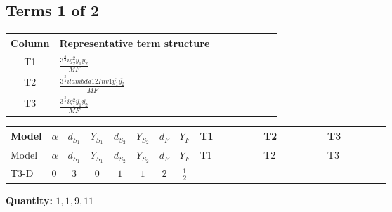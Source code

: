 \documentclass[8pt]{article}
\begin{document}
\begin{landscape}
\subsection*{Terms 1 of 2}
\begin{center}
\begin{tabular}{@{}c >{\raggedright\arraybackslash}p{0.82\linewidth}@{}}
\toprule
Column & Representative term structure \\
\midrule
T1 & \(\displaystyle \frac{3^{\frac{3}{4}} i g_{2}^{2} \overline{y_{1}} \overline{y_{2}}}{MF}\) \\
\midrule
T2 & \(\displaystyle \frac{3^{\frac{3}{4}} i lambda12Inv1 \overline{y_{1}} \overline{y_{2}}}{MF}\) \\
\midrule
T3 & \(\displaystyle \frac{3^{\frac{3}{4}} i g_{1}^{2} \overline{y_{1}} \overline{y_{2}}}{MF}\) \\
\midrule
\bottomrule
\end{tabular}
\end{center}
\smallskip
\tiny
\begin{longtable}{@{}llcccccc >{\raggedright\arraybackslash}p{0.21\linewidth} >{\raggedright\arraybackslash}p{0.21\linewidth} >{\raggedright\arraybackslash}p{0.21\linewidth}@{}}
\toprule
Model & $\alpha$ & $d_{S_1}$ & $Y_{S_1}$ & $d_{S_2}$ & $Y_{S_2}$ & $d_F$ & $Y_F$ & T1 & T2 & T3 \\
\midrule
\endfirsthead
\toprule
Model & $\alpha$ & $d_{S_1}$ & $Y_{S_1}$ & $d_{S_2}$ & $Y_{S_2}$ & $d_F$ & $Y_F$ & T1 & T2 & T3 \\
\midrule
\endhead
T3-D & $0$ & $3$ & $0$ & $1$ & $1$ & $2$ & $\frac{1}{2}$ & \scriptsize\adjustbox{max width=\linewidth}{$\begin{gathered} - \frac{11 \cdot 3^{\frac{3}{4}} i g_{2}^{2} \overline{y_{1}} \overline{y_{2}}}{8 MF}\end{gathered}$} & \scriptsize\adjustbox{max width=\linewidth}{$\begin{gathered} - \frac{3^{\frac{3}{4}} i lambda12Inv1 \overline{y_{1}} \overline{y_{2}}}{6 MF}\end{gathered}$} & \scriptsize\adjustbox{max width=\linewidth}{$\begin{gathered} - \frac{3^{\frac{3}{4}} i g_{1}^{2} \overline{y_{1}} \overline{y_{2}}}{8 MF}\end{gathered}$} \\
\midrule
\bottomrule
\end{longtable}
\clearpage
\noindent\textbf{Quantity: }$\mathrm{1,1,9,11}$\par\smallskip

\end{landscape}
\end{document}

